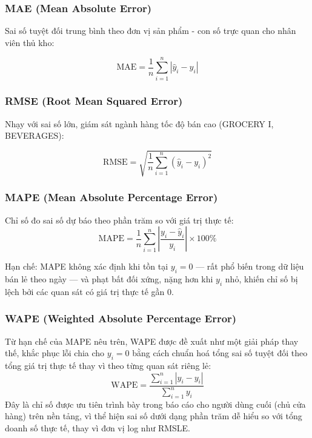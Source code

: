 \documentclass[12pt,a4paper]{report}
\begin{document}
\subsubsection{MAE (Mean Absolute Error)}
Sai số tuyệt đối trung bình theo đơn vị sản phẩm - con số trực quan cho nhân viên thủ kho:

\[
    \mathrm{MAE} = \frac{1}{n}\sum_{i=1}^{n} |\hat{y}_i - y_i|
\]

\subsubsection{RMSE (Root Mean Squared Error)}
Nhạy với sai số lớn, giám sát ngành hàng tốc độ bán cao (GROCERY I, BEVERAGES):

\[
    \mathrm{RMSE} = \sqrt{\frac{1}{n}\sum_{i=1}^{n} (\hat{y}_i - y_i)^2}
\]

\subsubsection{MAPE (Mean Absolute Percentage Error)}
Chỉ số đo sai số dự báo theo phần trăm so với giá trị thực tế:
\[
    \mathrm{MAPE} = \frac{1}{n}\sum_{i=1}^{n} \left|\frac{y_i - \hat{y}_i}{y_i}\right| \times 100\%
\]

Hạn chế: MAPE không xác định khi tồn tại $y_i = 0$ --- rất phổ biến trong dữ liệu bán lẻ
theo ngày --- và phạt bất đối xứng, nặng hơn khi $y_i$ nhỏ, khiến chỉ số bị lệch bởi các
quan sát có giá trị thực tế gần 0.

\subsubsection{WAPE (Weighted Absolute Percentage Error)}
Từ hạn chế của MAPE nêu trên, WAPE được đề xuất như một giải pháp thay thế, khắc phục
lỗi chia cho $y_i = 0$ bằng cách chuẩn hoá tổng sai số tuyệt đối theo tổng giá trị thực
tế thay vì theo từng quan sát riêng lẻ:
\[
    \mathrm{WAPE} = \frac{\sum_{i=1}^{n} |\hat{y}_i - y_i|}{\sum_{i=1}^{n} y_i}
\]
Đây là chỉ số được ưu tiên trình bày trong báo cáo cho người dùng cuối (chủ cửa hàng)
trên nền tảng, vì thể hiện sai số dưới dạng phần trăm dễ hiểu so với tổng doanh số thực
tế, thay vì đơn vị log như RMSLE.
\end{document}
